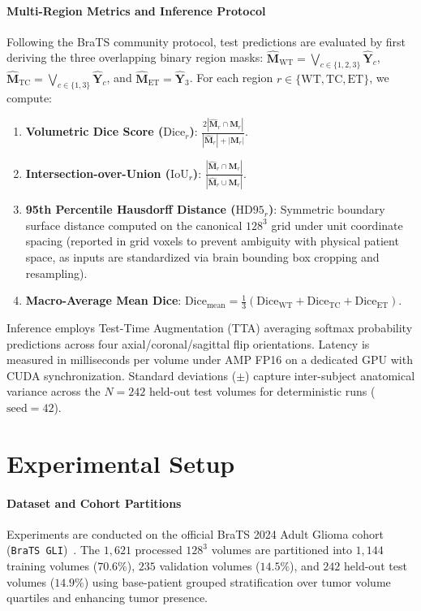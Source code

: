 \documentclass{article}
\begin{document}
\paragraph{Multi-Region Metrics and Inference Protocol}
Following the BraTS community protocol, test predictions are evaluated by first deriving the three overlapping binary region masks: $\hat{\mathbf{M}}_{\text{WT}} = \bigvee_{c \in \{1,2,3\}} \hat{\mathbf{Y}}_c$, $\hat{\mathbf{M}}_{\text{TC}} = \bigvee_{c \in \{1,3\}} \hat{\mathbf{Y}}_c$, and $\hat{\mathbf{M}}_{\text{ET}} = \hat{\mathbf{Y}}_3$. For each region $r \in \{\text{WT}, \text{TC}, \text{ET}\}$, we compute:
\begin{enumerate}
    \item \textbf{Volumetric Dice Score ($\text{Dice}_{r}$)}: $\frac{2 |\hat{\mathbf{M}}_r \cap \mathbf{M}_r|}{|\hat{\mathbf{M}}_r| + |\mathbf{M}_r|}$.
    \item \textbf{Intersection-over-Union ($\text{IoU}_{r}$)}: $\frac{|\hat{\mathbf{M}}_r \cap \mathbf{M}_r|}{|\hat{\mathbf{M}}_r \cup \mathbf{M}_r|}$.
    \item \textbf{95th Percentile Hausdorff Distance ($\text{HD95}_{r}$)}: Symmetric boundary surface distance computed on the canonical $128^3$ grid under unit coordinate spacing (reported in grid voxels to prevent ambiguity with physical patient space, as inputs are standardized via brain bounding box cropping and resampling).
    \item \textbf{Macro-Average Mean Dice}: $\text{Dice}_{\text{mean}} = \frac{1}{3}(\text{Dice}_{\text{WT}} + \text{Dice}_{\text{TC}} + \text{Dice}_{\text{ET}})$.
\end{enumerate}
Inference employs Test-Time Augmentation (TTA) averaging softmax probability predictions across four axial/coronal/sagittal flip orientations. Latency is measured in milliseconds per volume under AMP FP16 on a dedicated GPU with CUDA synchronization. Standard deviations ($\pm$) capture inter-subject anatomical variance across the $N=242$ held-out test volumes for deterministic runs ($\text{seed}=42$).


\section{Experimental Setup}
\label{sec:experimental_setup}

\paragraph{Dataset and Cohort Partitions}
Experiments are conducted on the official BraTS 2024 Adult Glioma cohort (\texttt{BraTS GLI})~\citep{brats2024}. The $1,621$ processed $128^3$ volumes are partitioned into $1,144$ training volumes ($70.6\%$), $235$ validation volumes ($14.5\%$), and $242$ held-out test volumes ($14.9\%$) using base-patient grouped stratification over tumor volume quartiles and enhancing tumor presence.
\end{document}
